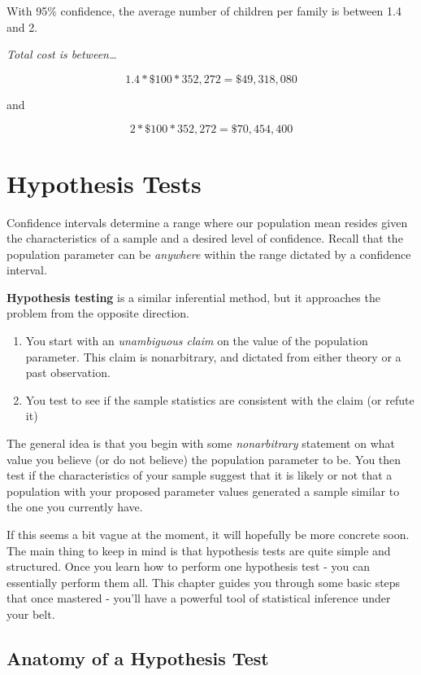 \documentclass[
]{book}
\begin{document}
With 95\% confidence, the average number of children per family is between 1.4 and 2.

\emph{Total cost is between\ldots{}}

\[1.4 * \$100 * 352,272 = \$49,318,080\]

and

\[2 * \$100 * 352,272 = \$70,454,400\]

\hypertarget{HT}{%
\chapter{Hypothesis Tests}\label{HT}}

Confidence intervals determine a range where our population mean resides given the characteristics of a sample and a desired level of confidence. Recall that the population parameter can be \emph{anywhere} within the range dictated by a confidence interval.

\textbf{Hypothesis testing} is a similar inferential method, but it approaches the problem from the opposite direction.

\begin{enumerate}
\def\labelenumi{\arabic{enumi}.}
\item
  You start with an \emph{unambiguous claim} on the value of the population parameter. This claim is nonarbitrary, and dictated from either theory or a past observation.
\item
  You test to see if the sample statistics are consistent with the claim (or refute it)
\end{enumerate}

The general idea is that you begin with some \emph{nonarbitrary} statement on what value you believe (or do not believe) the population parameter to be. You then test if the characteristics of your sample suggest that it is likely or not that a population with your proposed parameter values generated a sample similar to the one you currently have.

If this seems a bit vague at the moment, it will hopefully be more concrete soon. The main thing to keep in mind is that hypothesis tests are quite simple and structured. Once you learn how to perform one hypothesis test - you can essentially perform them all. This chapter guides you through some basic steps that once mastered - you'll have a powerful tool of statistical inference under your belt.

\hypertarget{anatomy-of-a-hypothesis-test}{%
\section{Anatomy of a Hypothesis Test}\label{anatomy-of-a-hypothesis-test}}
\end{document}
